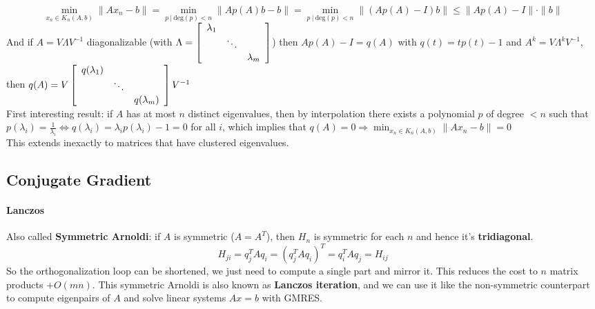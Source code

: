 \documentclass[10pt]{report}
\begin{document}
$$\min_{x_n\in K_n(A,b)} \|Ax_n-b\| = \min_{p\:|\:\text{deg}(p)<n}\|Ap(A)b - b\| =  \min_{p\:|\:\text{deg}(p)<n}\|(Ap(A)-I)b\| \leq \|Ap(A)-I\|\cdot\|b\|$$
And if $A = V\Lambda V^{-1}$ diagonalizable (with $\Lambda = \left[\begin{array}{c c c}
\lambda_1\\
& \ddots\\
& & \lambda_m
\end{array}\right]$) then $Ap(A)-I = q(A)$ with $q(t) = tp(t)-1$ and $A^k = V\Lambda^kV^{-1}$, then $q(A) = V\left[\begin{array}{c c c}
q(\lambda_1)\\
& \ddots\\
& & q(\lambda_m)
\end{array}\right] V^{-1}$\\
First interesting result: if $A$ has at most $n$ distinct eigenvalues, then by interpolation there exists a polynomial $p$ of degree $< n$ such that $p(\lambda_i)=\frac{1}{\lambda_i}\Leftrightarrow q(\lambda_i)=\lambda_ip(\lambda_i)-1 = 0$ for all $i$, which implies that $q(A) = 0\Rightarrow \min_{x_n\in K_n(A,b)} \|Ax_n - b\| = 0$\\
This extends inexactly to matrices that have clustered eigenvalues.
\subsection{Conjugate Gradient}
\paragraph{Lanczos} Also called \textbf{Symmetric Arnoldi}: if $A$ is symmetric ($A=A^T$), then $H_n$ is symmetric for each $n$ and hence it's \textbf{tridiagonal}.
$$H_{ji} = q_j^TAq_i = (q_j^TAq_i)^T=q_i^TAq_j=H_{ij}$$
So the orthogonalization loop can be shortened, we just need to compute a single part and mirror it. This reduces the cost to $n$ matrix products $+O(mn)$. This symmetric Arnoldi is also known as \textbf{Lanczos iteration}, and we can use it like the non-symmetric counterpart to compute eigenpairs of $A$ and solve linear systems $Ax=b$ with GMRES.
\end{document}
